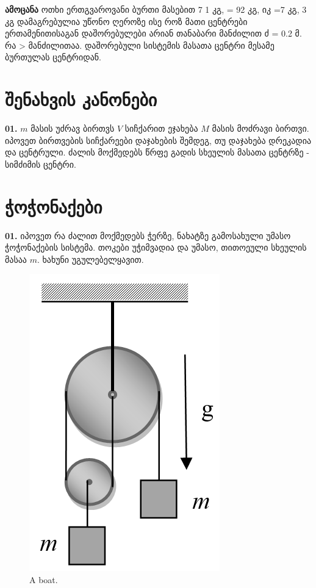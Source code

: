\documentclass{book}
\begin{document}
\textbf{ამოცანა} ოთხი ერთგვაროვანი ბურთი მასებით 7 1 კგ,  = 92 კგ, იკ =7 კგ, 3 კგ დამაგრებულია უწონო ღეროზე ისე როზ მათი ცენტრები ერთამენითისაგან დაშორებულები არიან თანაბარი მანძილით ძ = 0.2 მ. რა > მანძილითაა. დაშორებული სისტემის მასათა ცენტრი მესამე ბურთულას ცენტრიდან.






 

\section{შენახვის კანონები}
\textbf{01.} $m$ მასის უძრავ ბირთვს $V$ სიჩქარით ეჯახება $M$ მასის მოძრავი ბირთვი. იპოვეთ ბირთვების სიჩქარეები დაჯახების შემდეგ, თუ დაჯახება დრეკადია და ცენტრული. ძალის მოქმედებს წრფე გადის სხეულის მასათა ცენტრზე - სიმძიმის ცენტრი.
	
\section{ჭოჭონაქები}
\textbf{01.} იპოვეთ რა ძალით მოქმედებს ჭერზე, ნახატზე გამოსახული უმასო ჭოჭონაქების სისტემა. თოკები უჭიმვადია და უმასო,  თითოეული სხეულის მასაა $m$.  ხახუნი უგულებელყავით.
		\begin{figure}[H]
			\centering
			\includegraphics[width=0.2\columnwidth]{figures/03}
			\caption{A boat.}
			\label{fig:wowonaqi}
		\end{figure}
\end{document}
